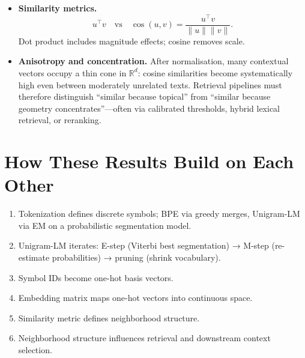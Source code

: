 \begin{itemize}[leftmargin=1.5em]
  \emph{M-step (re-estimation).} Given counts $c(t)$, normalise to obtain updated unigram probabilities:
  \[
    p(t) \leftarrow \frac{c(t)}{\sum_{t'} c(t')}.
  \]

  \emph{Pruning step.} After each M-step, tokens whose removal decreases the total corpus log-likelihood by less than a threshold $\eta$ are pruned from the vocabulary. This iteratively shrinks the vocabulary to the target size $|V|$.

  \emph{Why this matters for the reader.} The SentencePiece library (default tokenizer for many open-weight models) can run Unigram-LM mode. Understanding the EM framing explains: (a) why the same string may have multiple valid tokenisations (used during training via subword regularisation); (b) why the vocabulary selection is likelihood-based rather than frequency-based; and (c) why adding private-corpus tokens requires re-running or initialising the EM loop, not just appending to the merge table as in BPE.
  \item \textbf{Similarity metrics.}
  \[
    u^\top v \quad \text{vs} \quad \cos(u,v)=\frac{u^\top v}{\|u\|\|v\|}.
  \]
  Dot product includes magnitude effects; cosine removes scale.
  \item \textbf{Anisotropy and concentration.} After normalisation, many contextual vectors occupy a thin cone in $\mathbb{R}^d$: cosine similarities become systematically high even between moderately unrelated texts. Retrieval pipelines must therefore distinguish ``similar because topical'' from ``similar because geometry concentrates''---often via calibrated thresholds, hybrid lexical retrieval, or reranking.
\end{itemize}

\section*{How These Results Build on Each Other}
\begin{enumerate}[leftmargin=1.5em]
  \item Tokenization defines discrete symbols; BPE via greedy merges, Unigram-LM via EM on a probabilistic segmentation model.
  \item Unigram-LM iterates: E-step (Viterbi best segmentation) → M-step (re-estimate probabilities) → pruning (shrink vocabulary).
  \item Symbol IDs become one-hot basis vectors.
  \item Embedding matrix maps one-hot vectors into continuous space.
  \item Similarity metric defines neighborhood structure.
  \item Neighborhood structure influences retrieval and downstream context selection.
\end{enumerate}

